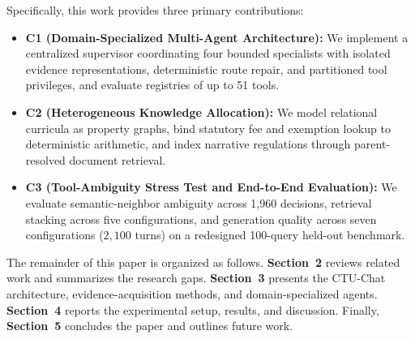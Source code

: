 Specifically, this work provides three primary contributions:
\begin{itemize}
    \setlength{\itemsep}{1.5pt}
    \setlength{\parsep}{0pt}
    \setlength{\parskip}{0pt}
    \item \textbf{C1 (Domain-Specialized Multi-Agent Architecture):} We implement a centralized supervisor coordinating four bounded specialists with isolated evidence representations, deterministic route repair, and partitioned tool privileges, and evaluate registries of up to 51 tools.
    \item \textbf{C2 (Heterogeneous Knowledge Allocation):} We model relational curricula as property graphs, bind statutory fee and exemption lookup to deterministic arithmetic, and index narrative regulations through parent-resolved document retrieval.
    \item \textbf{C3 (Tool-Ambiguity Stress Test and End-to-End Evaluation):} We evaluate semantic-neighbor ambiguity across 1,960 decisions, retrieval stacking across five configurations, and generation quality across seven configurations ($2,100$ turns) on a redesigned 100-query held-out benchmark.
\end{itemize}

The remainder of this paper is organized as follows. \textbf{Section~2} reviews related work and summarizes the research gaps. \textbf{Section~3} presents the CTU-Chat architecture, evidence-acquisition methods, and domain-specialized agents. \textbf{Section~4} reports the experimental setup, results, and discussion. Finally, \textbf{Section~5} concludes the paper and outlines future work.
